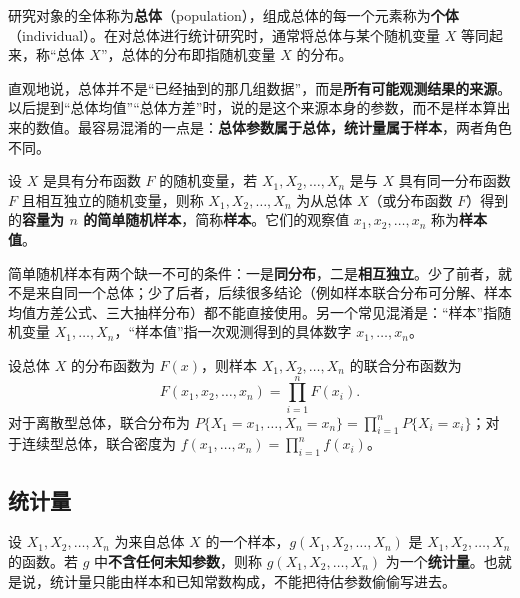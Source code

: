 ﻿\documentclass[lang=cn,11pt]{elegantbook}
\begin{document}
\begin{definition}[总体与个体] \label{def:population}
研究对象的全体称为\textbf{总体}（population），组成总体的每一个元素称为\textbf{个体}（individual）。在对总体进行统计研究时，通常将总体与某个随机变量 \(X\) 等同起来，称“总体 \(X\)”，总体的分布即指随机变量 \(X\) 的分布。
\end{definition}

\begin{note}
直观地说，总体并不是“已经抽到的那几组数据”，而是\textbf{所有可能观测结果的来源}。以后提到“总体均值”“总体方差”时，说的是这个来源本身的参数，而不是样本算出来的数值。最容易混淆的一点是：\textbf{总体参数属于总体，统计量属于样本}，两者角色不同。
\end{note}

\begin{definition}[简单随机样本] \label{def:sample}
设 \(X\) 是具有分布函数 \(F\) 的随机变量，若 \(X_1, X_2, \dots, X_n\) 是与 \(X\) 具有同一分布函数 \(F\) 且相互独立的随机变量，则称 \(X_1, X_2, \dots, X_n\) 为从总体 \(X\)（或分布函数 \(F\)）得到的\textbf{容量为 \(n\) 的简单随机样本}，简称\textbf{样本}。它们的观察值 \(x_1, x_2, \dots, x_n\) 称为\textbf{样本值}。
\end{definition}

\begin{note}
简单随机样本有两个缺一不可的条件：一是\textbf{同分布}，二是\textbf{相互独立}。少了前者，就不是来自同一个总体；少了后者，后续很多结论（例如样本联合分布可分解、样本均值方差公式、三大抽样分布）都不能直接使用。另一个常见混淆是：“样本”指随机变量 \(X_1,\dots,X_n\)，“样本值”指一次观测得到的具体数字 \(x_1,\dots,x_n\)。
\end{note}

\begin{property}[样本的分布] \label{prop:sample-dist}
设总体 \(X\) 的分布函数为 \(F(x)\)，则样本 \(X_1, X_2, \dots, X_n\) 的联合分布函数为
\[
F(x_1, x_2, \dots, x_n) = \prod_{i=1}^{n} F(x_i).
\]
对于离散型总体，联合分布为 \(P\{X_1 = x_1, \dots, X_n = x_n\} = \prod_{i=1}^{n} P\{X_i = x_i\}\)；对于连续型总体，联合密度为 \(f(x_1, \dots, x_n) = \prod_{i=1}^{n} f(x_i)\)。
\end{property}


\subsection{统计量}

\begin{definition}[统计量] \label{def:statistic}
设 \(X_1, X_2, \dots, X_n\) 为来自总体 \(X\) 的一个样本，\(g(X_1, X_2, \dots, X_n)\) 是 \(X_1, X_2, \dots, X_n\) 的函数。若 \(g\) 中\textbf{不含任何未知参数}，则称 \(g(X_1, X_2, \dots, X_n)\) 为一个\textbf{统计量}。也就是说，统计量只能由样本和已知常数构成，不能把待估参数偷偷写进去。
\end{definition}
\end{document}
